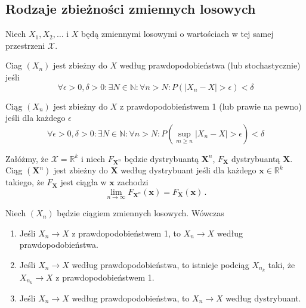 \documentclass{myclass}
\numberwithin{equation}{subsection}
\begin{document}
\subsection{Rodzaje zbieżności zmiennych losowych}

Niech \(X_1, X_2, \ldots\) i \(X\) będą zmiennymi losowymi o wartościach w tej samej przestrzeni
\(\mathcal{X}\).

\begin{definition}
Ciag \((X_n)\) jest zbieżny do \(X\) według prawdopodobieństwa (lub stochastycznie) jeśli
\begin{equation*}
    \forall \epsilon > 0, \delta > 0 : \exists N \in \mathbb{N} : \forall n > N : P\left(|X_n - X| > \epsilon\right) < \delta
\end{equation*}
\end{definition}

\begin{definition}
Ciąg \((X_n)\) jest zbieżny do \(X\) z prawdopodobieństwem 1 (lub prawie na pewno) jeśli dla każdego
\(\epsilon\)
\begin{equation*}
    \forall \epsilon > 0, \delta > 0 : \exists N \in \mathbb{N} : \forall n > N : P\left(\sup_{m \geq n} |X_n - X| >  \epsilon\right) < \delta
\end{equation*}
\end{definition}

\begin{definition}
Załóżmy, że \(\mathcal{X} = \mathbb{R}^k\) i niech \(F_{\mathbf{X}^n}\) będzie dystrybuantą
\(\mathbf{X}^n\), \(F_\mathbf{X}\) dystrybuantą \(\mathbf{X}\). Ciąg \((\mathbf{X}^n)\) jest zbieżny
do \(\mathbf{X}\) według dystrybuant jeśli dla każdego \(\mathbf{x} \in \mathbb{R}^k\) takiego, że
\(F_\mathbf{X}\) jest ciągła w \(\mathbf{x}\) zachodzi
\begin{equation*}
    \lim_{n \to \infty} F_{\mathbf{X}^n}(\mathbf{x}) = F_\mathbf{X}(\mathbf{x})\,.
\end{equation*}
\end{definition}

\begin{theorem}
Niech \((X_n)\) będzie ciągiem zmiennych losowych. Wówczas
\begin{enumerate}

    \item Jeśli \(X_n \to X\) z prawdopodobieństwem 1, to \(X_n \to X\) według prawdopodobieństwa.

    \item Jeśli \(X_n \to X\) według prawdopodobieństwa, to istnieje podciąg \(X_{n_k}\) taki, że
    \(X_{n_k} \to X\) z prawdopodobieństwem 1.

    \item Jeśli \(X_n \to X\) według prawdopodobieństwa, to \(X_n \to X\) według dystrybuant.

\end{enumerate}
\end{theorem}
\end{document}
